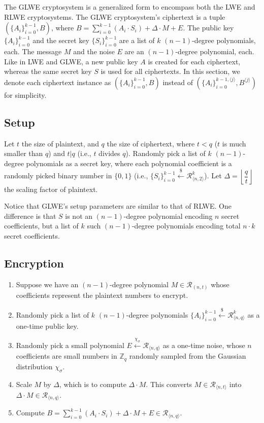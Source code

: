 The GLWE cryptosystem is a generalized form to encompass both the LWE and RLWE cryptosystems. The GLWE cryptosystem's ciphertext is a tuple $(\{A_i\}_{i=0}^{k-1}, B)$, where $B = \sum\limits_{i=0}^{k-1}{(A_i \cdot S_i)} + \Delta \cdot M + E$. The public key $\{A_i\}_{i=0}^{k-1}$ and the secret key $\{S_i\}_{i=0}^{k-1}$ are a list of $k$ $(n-1)$-degree polynomials, each. The message $M$ and the noise $E$ are an $(n-1)$-degree polynomial, each. Like in LWE and GLWE, a new public key $A$ is created for each ciphertext, whereas the same secret key $S$ is used for all ciphertexts. In this section, we denote each ciphertext instance as $(\{A_i\}_{i=0}^{k-1}, B)$ instead of $(\{A_i\}_{i=0}^{k-1, \langle j \rangle}, B^{\langle j \rangle})$ for simplicity.




\subsection{Setup}
Let $t$ the size of plaintext, and $q$ the size of ciphertext, where $t < q$ ($t$ is much smaller than $q$) and $t | q$ (i.e., $t$ divides $q$). Randomly pick a list of $k$ $(n-1)$-degree polynomials as a secret key, where each polynomial coefficient is a randomly picked binary number in $\{0, 1\}$ (i.e., $\{S_i\}_{i=0}^{k-1} \xleftarrow{\$} \mathcal{R}_{\langle n, 2 \rangle}^k$). Let $\Delta = \left\lfloor\dfrac{q}{t}\right\rfloor$ the scaling factor of plaintext.

Notice that GLWE's setup parameters are similar to that of RLWE. One difference is that $S$ is not an $(n-1)$-degree polynomial encoding $n$ secret coefficients, but a list of $k$ such $(n-1)$-degree polynomials encoding total $n \cdot k$ secret coefficients.


\subsection{Encryption}
\label{subsec:glwe-enc}

\begin{enumerate}
\item Suppose we have an $(n-1)$-degree polynomial $M \in \mathcal{R}_{(n, t)}$ whose coefficients represent the plaintext numbers to encrypt.
\item Randomly pick a list of $k$ $(n-1)$-degree polynomials $\{A_i\}_{i=0}^{k-1} \xleftarrow{\$} \mathcal{R}_{\langle n,q \rangle}^{k}$ as a one-time public key. 
\item Randomly pick a small polynomial $E \xleftarrow{\chi_\sigma} \mathcal{R}_{\langle n,q \rangle}$ as a one-time noise, whose $n$ coefficients are small numbers in $\mathbb{Z}_q$ randomly sampled from the Gaussian distribution $\chi_\sigma$. 
\item Scale $M$ by $\Delta$, which is to compute $\Delta \cdot M$. This converts $M \in \mathcal{R}_{\langle n, t \rangle}$ into $\Delta \cdot M \in \mathcal{R}_{\langle n,q \rangle}$.
\item Compute $B = \sum\limits_{i=0}^{k-1}{(A_i \cdot S_i)} + \Delta \cdot M + E \in \mathcal{R}_{\langle n,q \rangle}$. 
\end{enumerate}


